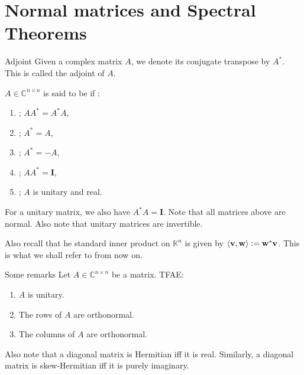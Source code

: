 \documentclass[dvipsnames]{beamer}
\theoremstyle{definition}
\begin{document}
\section{Normal matrices and Spectral Theorems}
\begin{frame}{Adjoint}
    Given a complex matrix $A$, we denote its conjugate transpose by $A^{\ast}$. This is called the adjoint of $A$. \pause

    $A \in \mathbb{C}^{n \times n}$ is said to be \underline{\phantom{hello}} if \underline{\phantom{hello}}: 
    \begin{enumerate}[<+->]
        \item {}; $AA^{\ast} = A^{\ast} A$,
        \item {}; $A^{\ast} = A$,
        \item {}; $A^{\ast} = -A$,
        \item {}; $AA^{\ast} = \mathbf{I}$,
        \item {}; $A$ is unitary and real.
    \end{enumerate} \pause
    For a unitary matrix, we also have $A^{\ast}A = \mathbf{I}$. \pause Note that all matrices above are normal. \pause Also note that unitary matrices are invertible. \pause

    Also recall that he standard inner product on $\mathbb{K}^{n}$ is given by $\langle \mathbf{v}, \mathbf{w}\rangle \vcentcolon= \mathbf{w}^{\ast} \mathbf{v}$. \pause This is what we shall refer to from now on.
\end{frame}
\begin{frame}{Some remarks}
    Let $A \in \mathbb{C}^{n \times n}$ be a matrix. TFAE: \pause
    \begin{enumerate}[<+->]
        \item $A$ is unitary.
        \item The rows of $A$ are orthonormal.
        \item The columns of $A$ are orthonormal.
    \end{enumerate} \pause

    Also note that a diagonal matrix is Hermitian iff it is real. \newline
    Similarly, a diagonal matrix is skew-Hermitian iff it is purely imaginary.
\end{frame}
\end{document}
